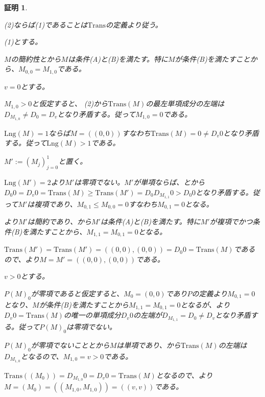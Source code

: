 \documentclass[dvipdfmx,uplatex]{jsarticle}
\theoremstyle{customnonumberbreakfortheorem}
\theoremstyle{customnonumberbreakforproof}
\newtheorem{hideableproof}{証明}
\begin{document}
\begin{hideableproof}
	\begin{indented}
		\item (2)ならば(1)であることは\(\textrm{Trans}\)の定義より従う。
		\item (1)とする。
		\begin{indented}
			\item \(M\)の簡約性とから\(M\)は条件(A)と(B)を満たす。特に\(M\)が条件(B)を満たすことから、\(M_{0,0} = M_{1,0}\)である。
			\item \(v = 0\)とする。
			\begin{indented}
				\item \(M_{1,0} > 0\)と仮定すると、 (2)から\(\textrm{Trans}(M)\)の最左単項成分の左端は\(D_{M_{1,0}} \neq D_0 = D_v\)となり矛盾する。従って\(M_{1,0} = 0\)である。
				\item \(\textrm{Lng}(M) = 1\)ならば\(M= ((0,0))\)すなわち\(\textrm{Trans}(M) = 0 \neq D_v 0\)となり矛盾する。従って\(\textrm{Lng}(M) > 1\)である。
				\item \(M' := (M_j)_{j=0}^{1}\)と置く。
				\item \(\textrm{Lng}(M') = 2\)より\(M'\)は零項でない。\(M'\)が単項ならば、とから\(D_0 0 = D_v 0 = \textrm{Trans}(M) \geq \textrm{Trans}(M') = D_0 D_{M_{1,1}} 0 > D_0 0\)となり矛盾する。従って\(M'\)は複項であり、\(M_{0,1} \leq M_{0,0} = 0\)すなわち\(M_{0,1} = 0\)となる。
				\item {}より\(M'\)は簡約であり、から\(M'\)は条件(A)と(B)を満たす。特に\(M'\)が複項でかつ条件(B)を満たすことから、\(M_{1,1} = M_{0,1} = 0\)となる。
				\item \(\textrm{Trans}(M') = \textrm{Trans}(M') = ((0,0),(0,0)) = D_0 0 = \textrm{Trans}(M)\)であるので、より\(M = M' = ((0,0),(0,0))\)である。
			\end{indented}
			\item \(v > 0\)とする。
			\begin{indented}
				\item \(P(M)_0\)が零項であると仮定すると、\(M_0 = (0,0)\)であり\(P\)の定義より\(M_{0,1} = 0\)となり、\(M\)が条件(B)を満たすことから\(M_{1,1} = M_{0,1} = 0\)となるが、より\(D_v 0 = \textrm{Trans}(M)\)の唯一の単項成分\(D_v 0\)の左端が\(D_{M_{1,1}} = D_0 \neq D_v\)となり矛盾する。従って\(P(M)_0\)は零項でない。
				\item \(P(M)_0\)が零項でないこととから\(M\)は単項であり、から\(\textrm{Trans}(M)\)の左端は\(D_{M_{1,0}}\)となるので、\(M_{1,0} = v > 0\)である。
				\item \(\textrm{Trans}((M_0)) = D_{M_{1,0}} 0 = D_v 0 = \textrm{Trans}(M)\)となるので、より\(M = (M_0) = ((M_{1,0},M_{1,0})) = ((v,v))\)である。
			\end{indented}
		\end{indented}
	\end{indented}
\end{hideableproof}
\end{document}
